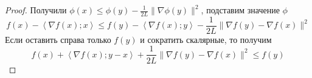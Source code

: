 \begin{proof}
  Получили $\phi(x) \le \phi(y) - \frac{1}{2L} \| \nabla \phi (y) \|^2$, подставим значение $\phi$
  \[
  f(x) - \left\langle \nabla f(x); x \right\rangle \le f(y) - \left\langle \nabla f(x);y \right\rangle - \frac{1}{2L} \| \nabla f(y) - \nabla f(x) \|^2
  \]
  Если оставить справа только $f(y)$ и сократить скалярные, то получим
  \[
  f(x) + \left\langle \nabla f(x); y -x \right\rangle + \frac{1}{2L} \| \nabla f(y) - \nabla f(x) \|^2  \le f(y)
  \]
\end{proof}
